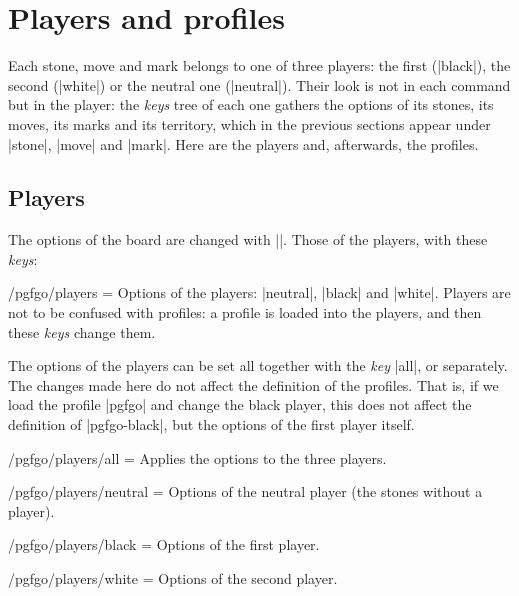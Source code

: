 \section{Players and profiles}
\label{sec:jugadores}

Each stone, move and mark belongs to one of three players: the first (|black|), the second (|white|) or the neutral one (|neutral|). Their look is not in each command but in the player: the \emph{keys} tree of each one gathers the options of its stones, its moves, its marks and its territory, which in the previous sections appear under |stone|, |move| and |mark|. Here are the players and, afterwards, the profiles.

\subsection{Players}

The options of the board are changed with ||. Those of the players, with these \emph{keys}:

\begin{key}{/pgfgo/players = }
	Options of the players: |neutral|, |black| and |white|. Players are not to be confused with profiles: a profile is loaded into the players, and then these \emph{keys} change them.
\end{key}

The options of the players can be set all together with the \emph{key} |all|, or separately. The changes made here do not affect the definition of the profiles. That is, if we load the profile |pgfgo| and change the black player, this does not affect the definition of |pgfgo-black|, but the options of the first player itself.

\begin{key}{/pgfgo/players/all = }
	Applies the options to the three players.
\end{key}

\begin{key}{/pgfgo/players/neutral = }
	Options of the neutral player (the stones without a player).
\end{key}

\begin{key}{/pgfgo/players/black = }
	Options of the first player.
\end{key}

\begin{key}{/pgfgo/players/white = }
	Options of the second player.

	\begin{codeexample}[width=4cm]

		\begin{goban}[3]
		\end{goban}
	\end{codeexample}
\end{key}

